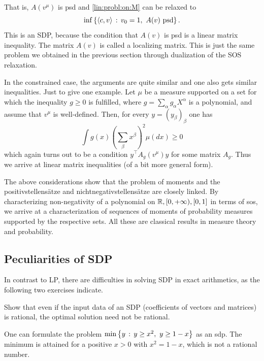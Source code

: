 That is, $A(v^\mu)$ is psd and \eqref{lin:probl:on:M} can be relaxed to 
\begin{equation}
	\label{moment:relaxation}
	\inf \left\{ \left\langle c , v \right\rangle \,:\, v_0=1, \ A(v) \ \text{psd} \right\}.
\end{equation}
This is an SDP, because the condition that $A(v)$ is psd is a linear matrix inequality. The matrix $A(v)$ is called a localizing matrix. 
This is just the same problem we obtained in the previous section through dualization of the SOS relaxation. 

In the constrained case, the arguments are quite similar and one also gets similar inequalities. Just to give one example. Let $\mu$ be a measure supported on a set for which the inequality $g \ge 0$ is fulfilled, where $g = \sum_\alpha g_\alpha X^\alpha$ is a polynomial, and assume that $v^\mu$ is well-defined. Then, for every $y=(y_\beta)_\beta$ one has
\[
	\int g(x) \left( \sum_\beta x^\beta \right)^2 \mu( d x) \ge 0
\] 
which again turns out to be a condition $y^\top A_g(v^\mu) y$ for some matrix $A_g$. Thus we arrive at linear matrix inequalities (of a bit more general form). 

The above considerations show that the problem of moments and the positivstellens{\"a}tze and nichtnegativstellensätze are closely linked. By characterizing non-negativity of a polynomial on $\mathbb{R}, [0,+\infty),[0,1]$ in terms of sos, we arrive at a characterization of sequences of moments of probability measures supported by the respective sets. All these are classical results in measure theory and probability. 

\subsection{Peculiarities of SDP}

In contrast to LP, there are difficulties in solving SDP in exact arithmetics, as the following two exercises indicate. 

\begin{exercise}
	Show that even if the input data of an SDP (coefficients of vectors and matrices) is rational, the optimal solution need not be rational. 
\end{exercise}
\begin{solution}
	One can formulate the problem $\min \left\{ y \,:\, y \ge x^2, \ y \ge 1 -x \right\}$ as an sdp. The minimum is attained for a positive $x > 0$ with $x^2 = 1 -x$, which is not a rational number.
\end{solution}

